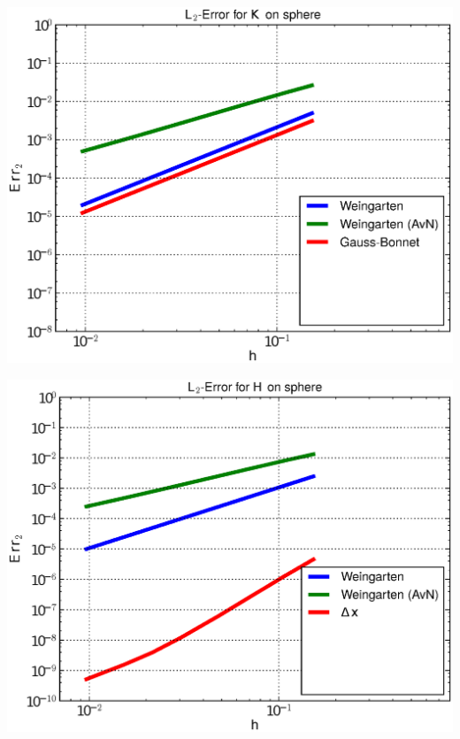 \documentclass{beamer}
\begin{document}
\begin{frame}
\begin{overprint}
\begin{minipage}[t]{0.49\textwidth}
            \centering\includegraphics[width=\textwidth]{bilder/Curvature/sphere/ErrKL2_3.eps}
          \end{minipage}\hfill
          \begin{minipage}[t]{0.49\textwidth}
            \centering\includegraphics[width=\textwidth]{bilder/Curvature/sphere/ErrHL2_3.eps}
          \end{minipage}
          \begin{minipage}[t]{0.49\textwidth}

\end{minipage}
\end{overprint}
\end{frame}
\end{document}
